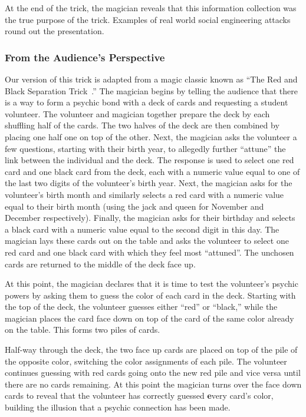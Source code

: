 At the end of the trick, the magician reveals that this information
collection was the true purpose of the trick.
Examples of real world social engineering attacks round out the
presentation.

\subsubsection{From the Audience's Perspective}

Our version of this trick is adapted from a magic classic
known as ``The Red and Black Separation Trick~\cite{redblackseparation}.''
The magician begins by
telling the audience that there
is a way to form a psychic bond with a deck of cards
and requesting a student volunteer.
The volunteer and magician
together prepare the deck
by each shuffling half of the cards.
The two halves of the deck are then combined by placing one half
one on top of the other.
Next, the magician asks the volunteer
a few questions, starting with their birth year,
to allegedly further ``attune''
the link between the individual and the deck.
The response
is used to select one red card and one black card from the deck,
each with a numeric value equal to one of the last two digits of
the volunteer's birth year.
Next, the magician asks for the volunteer's birth month and similarly selects
a red card with a numeric value equal
to their birth month (using the jack and queen for November and December
respectively).
Finally, the magician asks
for their birthday and selects a black card with a numeric value
equal to the second digit in this day.
The magician lays these cards out on the table and asks the volunteer to select
one red card and one black card with which they feel most ``attuned''.
The unchosen cards are returned to the middle
of the deck face up.

At this point, the magician declares
that it is time to test the volunteer's psychic powers by asking them to
guess the color of each card in the deck.  Starting with the top of the deck,
the volunteer guesses either ``red'' or ``black,''  while the magician
places the card face down on top of the card of the same
color already on the table.
This forms two piles of cards.

Half-way through the deck,
the two face up cards are placed on top of the
pile of the opposite color, switching the color assignments of
each pile.
The volunteer continues guessing
with red cards going onto the new red pile and vice versa
until
there are no cards remaining.
At this point the magician turns over the face
down cards to reveal that the volunteer has correctly guessed {\textbf every}
card's color, building the illusion that a psychic connection has been made.

